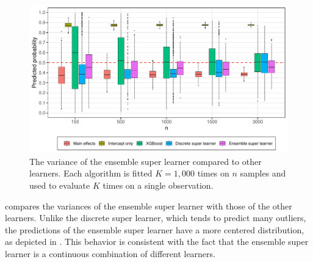 \documentclass[./main.tex]{subfiles}
\begin{document}
\begin{figure}[H]
    \centering
    \includegraphics[width=\textwidth]{figures/learner_vars_w_esl_1000.pdf}
    \caption{The variance of the ensemble super learner compared to other learners. Each algorithm is fitted $ K = 1,000 $ times on $n$ samples and used to evaluate $ K $ times on a single observation.}
    \label{fig:learner_vars_w_esl_1000}
\end{figure}
 compares the variances of the ensemble super learner with those of the other learners. Unlike the discrete super learner, which tends to predict many outliers, the predictions of the ensemble super learner have a more centered distribution, as depicted in . This behavior is consistent with the fact that the ensemble super learner is a continuous combination of different learners. 
\end{document}
